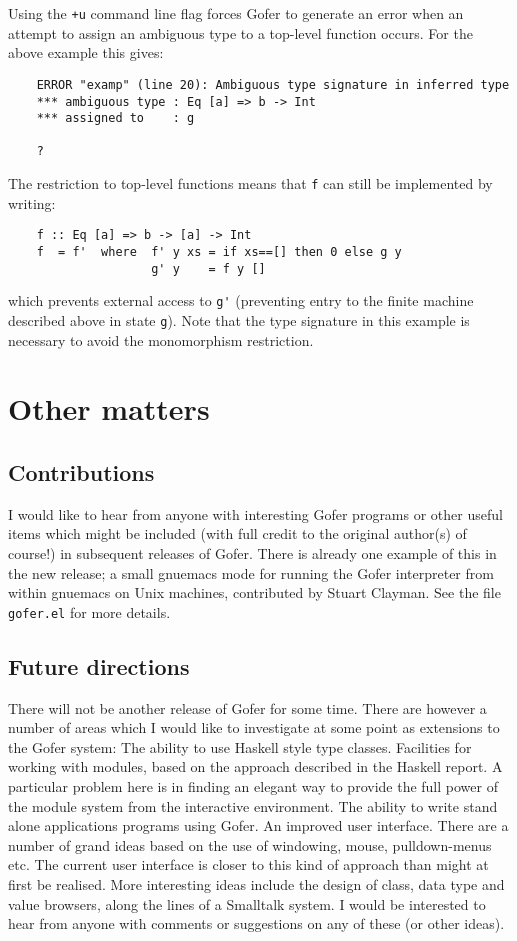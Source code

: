 Using the \verb"+u" command line flag forces Gofer to generate an error when
an attempt to assign an ambiguous type to a top-level function occurs.
For the above example this gives:
\begin{verbatim}
    ERROR "examp" (line 20): Ambiguous type signature in inferred type
    *** ambiguous type : Eq [a] => b -> Int
    *** assigned to    : g
 
    ?
\end{verbatim}
The restriction to top-level functions means that \verb"f" can still be
implemented by writing:
\begin{verbatim}
    f :: Eq [a] => b -> [a] -> Int
    f  = f'  where  f' y xs = if xs==[] then 0 else g y
                    g' y    = f y []
\end{verbatim}
which prevents external access to \verb"g'" (preventing entry to the finite
machine described above in state \verb"g").  Note that the type signature in
this example is necessary to avoid the monomorphism restriction.


\section{Other matters}

\subsection{Contributions}
I would like to hear from anyone with interesting Gofer programs or
other useful items which might be included (with full credit to the
original author(s) of course!) in subsequent releases of Gofer.  There
is already one example of this in the new release; a small gnuemacs
mode for running the Gofer interpreter from within gnuemacs on Unix
machines, contributed by Stuart Clayman.  See the file \verb"gofer.el" for
more details.

\subsection{Future directions}
There will not be another release of Gofer for some time.  There are
however a number of areas which I would like to investigate at some
point as extensions to the Gofer system:
\BI
\IT  The ability to use Haskell style type classes.
\IT  Facilities for working with modules, based on the approach
     described in the Haskell report.  A particular problem here is
     in finding an elegant way to provide the full power of the
     module system from the interactive environment.
\IT  The ability to write stand alone applications programs using
     Gofer.
\IT  An improved user interface.  There are a number of grand ideas
     based on the use of windowing, mouse, pulldown-menus etc.  The
     current user interface is closer to this kind of approach than
     might at first be realised.  More interesting ideas include the
     design of class, data type and value browsers, along the lines
     of a Smalltalk system.
\EI
I would be interested to hear from anyone with comments or suggestions
on any of these (or other ideas).



